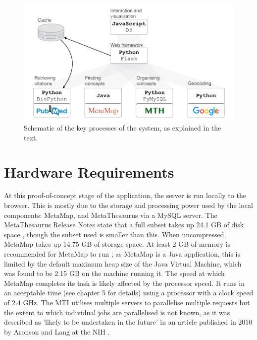 \documentclass[Report.tex]{subfiles}
\begin{document}
\begin{figure}[!ht]
	\includegraphics[width=\textwidth]{../lib/images/flow.png}
	\caption{Schematic of the key processes of the system, as explained in the text.}
\label{fig:flow}
\end{figure}

\section{Hardware Requirements}
At this proof-of-concept stage of the application, the server is run locally to the browser. This is mostly due to the storage and processing power used by the local components: MetaMap, and MetaThesaurus via a MySQL server. The MetaThesaurus Release Notes state that a full subset takes up 24.1 GB of disk space \cite{metathesaurus-release}, though the subset used is smaller than this. When uncompressed, MetaMap takes up 14.75 GB of storage space. At least 2 GB of memory is recommended for MetaMap to run \cite{metamap-install}; as MetaMap is a Java application, this is limited by the default maximum heap size of the Java Virtual Machine, which was found to be 2.15 GB on the machine running it. The speed at which MetaMap completes its task is likely affected by the processor speed. It runs in an acceptable time (see chapter 5 for details) using a processor with a clock speed of 2.4 GHz. The MTI utilises multiple servers to parallelise multiple requests but the extent to which individual jobs are parallelised is not known, as it was described as 'likely to be undertaken in the future' in an article published in 2010 by Aronson and Lang at the NIH \cite{metamap2010}.
\end{document}
